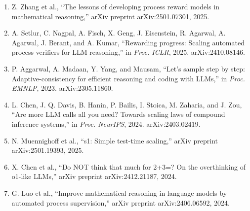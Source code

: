 \documentclass[10pt]{article}
\begin{document}
\begin{enumerate}
\item[{[39]}] Z. Zhang et al., ``The lessons of developing process reward models in mathematical reasoning,'' arXiv preprint arXiv:2501.07301, 2025.
\item[{[40]}] A. Setlur, C. Nagpal, A. Fisch, X. Geng, J. Eisenstein, R. Agarwal, A. Agarwal, J. Berant, and A. Kumar, ``Rewarding progress: Scaling automated process verifiers for LLM reasoning,'' in \emph{Proc. ICLR}, 2025. arXiv:2410.08146.
\item[{[41]}] P. Aggarwal, A. Madaan, Y. Yang, and Mausam, ``Let's sample step by step: Adaptive-consistency for efficient reasoning and coding with LLMs,'' in \emph{Proc. EMNLP}, 2023. arXiv:2305.11860.
\item[{[42]}] L. Chen, J. Q. Davis, B. Hanin, P. Bailis, I. Stoica, M. Zaharia, and J. Zou, ``Are more LLM calls all you need? Towards scaling laws of compound inference systems,'' in \emph{Proc. NeurIPS}, 2024. arXiv:2403.02419.
\item[{[43]}] N. Muennighoff et al., ``s1: Simple test-time scaling,'' arXiv preprint arXiv:2501.19393, 2025.
\item[{[44]}] X. Chen et al., ``Do NOT think that much for 2+3=? On the overthinking of o1-like LLMs,'' arXiv preprint arXiv:2412.21187, 2024.
\item[{[45]}] G. Luo et al., ``Improve mathematical reasoning in language models by automated process supervision,'' arXiv preprint arXiv:2406.06592, 2024.
\end{enumerate}
\end{document}

